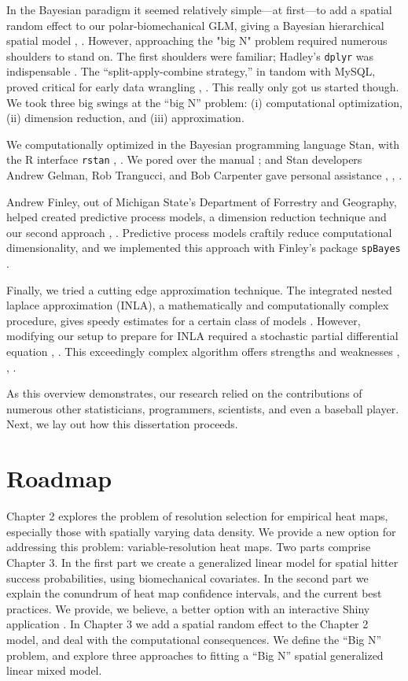 In the Bayesian paradigm it seemed relatively simple---at first---to add a spatial random effect to our polar-biomechanical GLM, giving a Bayesian hierarchical spatial model \citep{Gelman2014}, \citep{Banerjee2014}. However, approaching the "big N" problem required numerous shoulders to stand on. The first shoulders were familiar; Hadley's \verb|dplyr| was indispensable \citep{Wickham2016}. The ``split-apply-combine strategy,'' in tandom with MySQL, proved critical for early data wrangling \citep{Wickham2016}, \citep{Tahaghoghi2006}. This really only got us started though. We took three big swings at the ``big N'' problem: (i) computational optimization, (ii) dimension reduction, and (iii) approximation.

We computationally optimized in the Bayesian programming language Stan, with the R interface \verb|rstan| \citep{rstan}, \citep{Gelman2015}. We pored over the manual \citep{STANtheMan}; and Stan developers Andrew Gelman, Rob Trangucci, and Bob Carpenter gave personal assistance \citep{Gelman}, \citep{Trangucci}, \citep{Carpenter}.

Andrew Finley, out of Michigan State's Department of Forrestry and Geography, helped created predictive process models, a dimension reduction technique and our second approach \citep{Banerjee2008}, \citep{Finley2012}. Predictive process models craftily reduce computational dimensionality, and we implemented this approach with Finley's package \verb|spBayes| \citep{Finley2013}.

Finally, we tried a cutting edge approximation technique. The integrated nested laplace approximation (INLA), a mathematically and computationally complex procedure, gives speedy estimates for a certain class of models \citep{Rue2009}. However, modifying our setup to prepare for INLA required a stochastic partial differential equation \citep{Lindgren2011}, \citep{Lindstrom2016}. This exceedingly complex algorithm offers strengths and weaknesses \citep{Mondal2017}, \citep{Simpson2012b}, \citep{Rue2009}.

As this overview demonstrates, our research relied on the contributions of numerous other statisticians, programmers, scientists, and even a baseball player. Next, we lay out how this dissertation proceeds.

\section{Roadmap}

Chapter 2 explores the problem of resolution selection for empirical heat maps, especially those with spatially varying data density. We provide a new option for addressing this problem: variable-resolution heat maps. Two parts comprise Chapter 3. In the first part we create a generalized linear model for spatial hitter success probabilities, using biomechanical covariates. In the second part we explain the conundrum of heat map confidence intervals, and the current best practices. We provide, we believe, a better option with an interactive Shiny application \citep{Shiny}. In Chapter 3 we add a spatial random effect to the Chapter 2 model, and deal with the computational consequences. We define the ``Big N'' problem, and explore three approaches to fitting a ``Big N'' spatial generalized linear mixed model. 
